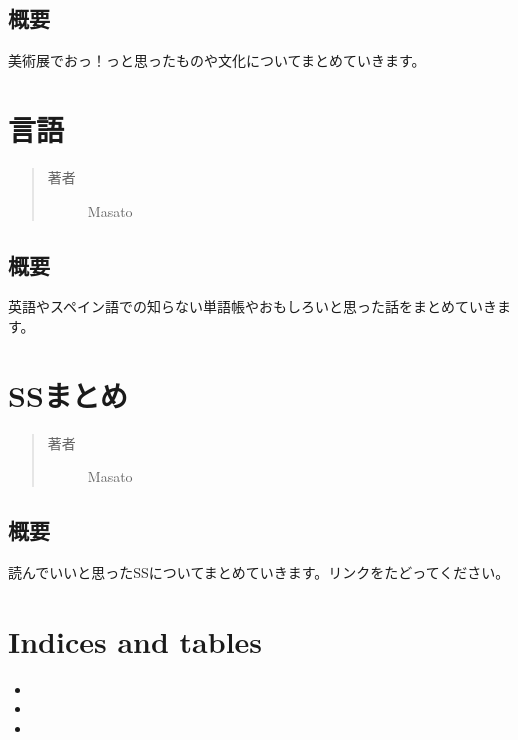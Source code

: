 \documentclass[letterpaper,10pt,dvipdfmx]{sphinxmanual}
\begin{document}
\section{概要}
\label{hobby_arts:id2}
美術展でおっ！っと思ったものや文化についてまとめていきます。


\chapter{言語}
\label{hobby_lang:id1}\label{hobby_lang::doc}\begin{quote}\begin{description}
\item[{著者}] \leavevmode
Masato

\end{description}\end{quote}


\section{概要}
\label{hobby_lang:id2}
英語やスペイン語での知らない単語帳やおもしろいと思った話をまとめていきます。


\chapter{SSまとめ}
\label{matome_ss:ss}\label{matome_ss::doc}\begin{quote}\begin{description}
\item[{著者}] \leavevmode
Masato

\end{description}\end{quote}


\section{概要}
\label{matome_ss:id1}
読んでいいと思ったSSについてまとめていきます。リンクをたどってください。


\chapter{Indices and tables}
\label{index:indices-and-tables}\begin{itemize}
\item {} 

\item {} 

\item {} 

\end{itemize}



\renewcommand{\indexname}{索引}
\printindex
\end{document}
